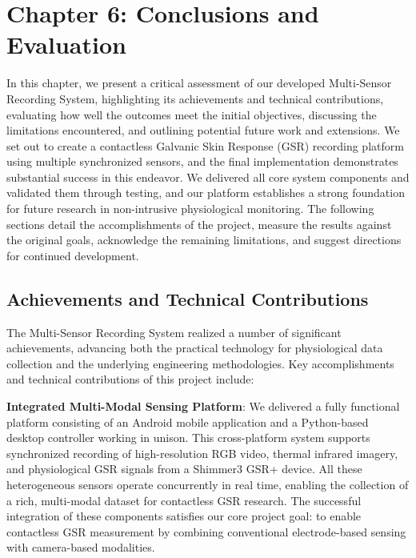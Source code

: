 \label{chap:6} \chapter{Chapter 6: Conclusions and Evaluation}

In this chapter, we present a critical assessment of our developed Multi-Sensor Recording System, highlighting its achievements and technical contributions, evaluating how well the outcomes meet the initial objectives, discussing the limitations encountered, and outlining potential future work and extensions. We set out to create a contactless Galvanic Skin Response (GSR) recording platform using multiple synchronized sensors, and the final implementation demonstrates substantial success in this endeavor. We delivered all core system components and validated them through testing, and our platform establishes a strong foundation for future research in non-intrusive physiological monitoring. The following sections detail the accomplishments of the project, measure the results against the original goals, acknowledge the remaining limitations, and suggest directions for continued development.

\section{Achievements and Technical Contributions}

The Multi-Sensor Recording System realized a number of significant achievements, advancing both the practical technology for physiological data collection and the underlying engineering methodologies. Key accomplishments and technical contributions of this project include:

\textbf{Integrated Multi-Modal Sensing Platform}: We delivered a fully functional platform consisting of an Android mobile application and a Python-based desktop controller working in unison. This cross-platform system supports synchronized recording of high-resolution RGB video, thermal infrared imagery, and physiological GSR signals from a Shimmer3 GSR+ device. All these heterogeneous sensors operate concurrently in real time, enabling the collection of a rich, multi-modal dataset for contactless GSR research. The successful integration of these components satisfies our core project goal: to enable contactless GSR measurement by combining conventional electrode-based sensing with camera-based modalities.

